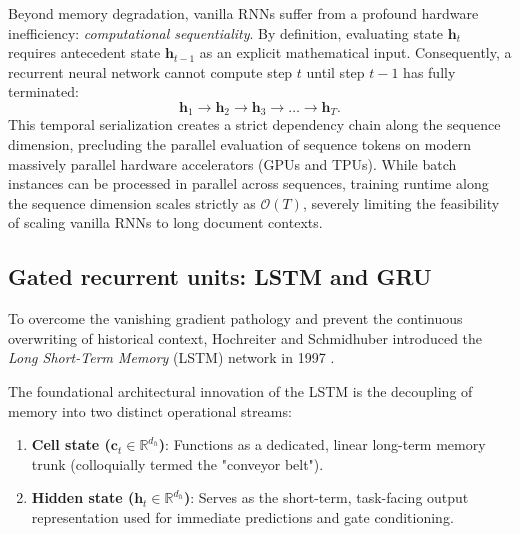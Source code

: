 \documentclass[../../../main.tex]{subfiles}
\begin{document}
Beyond memory degradation, vanilla RNNs suffer from a profound hardware inefficiency: \textit{computational sequentiality}. By definition, evaluating state $\mathbf{h}_t$ requires antecedent state $\mathbf{h}_{t-1}$ as an explicit mathematical input. Consequently, a recurrent neural network cannot compute step $t$ until step $t-1$ has fully terminated:
\begin{equation}
\mathbf{h}_1 \longrightarrow \mathbf{h}_2 \longrightarrow \mathbf{h}_3 \longrightarrow \dots \longrightarrow \mathbf{h}_T.
\end{equation}
This temporal serialization creates a strict dependency chain along the sequence dimension, precluding the parallel evaluation of sequence tokens on modern massively parallel hardware accelerators (GPUs and TPUs). While batch instances can be processed in parallel across sequences, training runtime along the sequence dimension scales strictly as $\mathcal{O}(T)$, severely limiting the feasibility of scaling vanilla RNNs to long document contexts.

\subsection{Gated recurrent units: LSTM and GRU}
\label{subsec:rnn_gated_architectures}

To overcome the vanishing gradient pathology and prevent the continuous overwriting of historical context, Hochreiter and Schmidhuber introduced the \textit{Long Short-Term Memory} (LSTM) network in 1997 \citep{hochreiter1997}.

The foundational architectural innovation of the LSTM is the decoupling of memory into two distinct operational streams:
\begin{enumerate}
    \item \textbf{Cell state ($\mathbf{c}_t \in \mathbb{R}^{d_h}$)}: Functions as a dedicated, linear long-term memory trunk (colloquially termed the "conveyor belt").
    \item \textbf{Hidden state ($\mathbf{h}_t \in \mathbb{R}^{d_h}$)}: Serves as the short-term, task-facing output representation used for immediate predictions and gate conditioning.
\end{enumerate}
\end{document}
